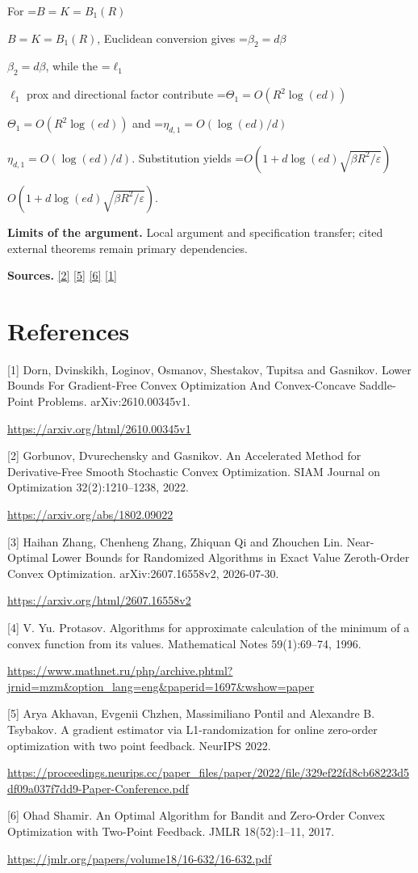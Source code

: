 \documentclass[10pt,a4paper]{article}
\newcommand{\AtlasMath}[1]{\par\begingroup\centering\setbox0=\hbox{$\displaystyle #1$}\ifdim\wd0>1.4\linewidth\typeout{ATLAS WIDE FORMULA: \the\wd0}\fi\ifdim\wd0>\linewidth\resizebox{\linewidth}{!}{\box0}\else\box0\fi\par\endgroup}
\newcommand{\AtlasInlineMath}[1]{\begingroup\setbox0=\hbox{$#1$}\ifdim\wd0>.4\linewidth\endgroup\AtlasMath{#1}\else\endgroup$#1$\fi}
\begin{document}
For \AtlasInlineMath{B=K=B_1(R)}, Euclidean conversion gives \AtlasInlineMath{\beta_2=d\beta}, while the \AtlasInlineMath{\ell_1} prox and directional factor contribute \AtlasInlineMath{\Theta_1=O(R^2\log(ed))} and \AtlasInlineMath{\eta_{d,1}=O(\log(ed)/d)}. Substitution yields \AtlasInlineMath{O(1+d\log(ed)\sqrt{\beta R^2/\varepsilon})}.

\textbf{Limits of the argument.} Local argument and specification transfer; cited external theorems remain primary dependencies.

\textbf{Sources.} \href{https://arxiv.org/abs/1802.09022}{[2]} \href{https://proceedings.neurips.cc/paper_files/paper/2022/file/329ef22fd8cb68223d5df09a037f7dd9-Paper-Conference.pdf}{[5]} \href{https://jmlr.org/papers/volume18/16-632/16-632.pdf}{[6]} \href{https://arxiv.org/html/2610.00345v1}{[1]}

\section{References}
[1] Dorn, Dvinskikh, Loginov, Osmanov, Shestakov, Tupitsa and Gasnikov. Lower Bounds For Gradient-Free Convex Optimization And Convex-Concave Saddle-Point Problems. arXiv:2610.00345v1.

\url{https://arxiv.org/html/2610.00345v1}

[2] Gorbunov, Dvurechensky and Gasnikov. An Accelerated Method for Derivative-Free Smooth Stochastic Convex Optimization. SIAM Journal on Optimization 32(2):1210--1238, 2022.

\url{https://arxiv.org/abs/1802.09022}

[3] Haihan Zhang, Chenheng Zhang, Zhiquan Qi and Zhouchen Lin. Near-Optimal Lower Bounds for Randomized Algorithms in Exact Value Zeroth-Order Convex Optimization. arXiv:2607.16558v2, 2026-07-30.

\url{https://arxiv.org/html/2607.16558v2}

[4] V. Yu. Protasov. Algorithms for approximate calculation of the minimum of a convex function from its values. Mathematical Notes 59(1):69--74, 1996.

\url{https://www.mathnet.ru/php/archive.phtml?jrnid=mzm&option_lang=eng&paperid=1697&wshow=paper}

[5] Arya Akhavan, Evgenii Chzhen, Massimiliano Pontil and Alexandre B. Tsybakov. A gradient estimator via L1-randomization for online zero-order optimization with two point feedback. NeurIPS 2022.

\url{https://proceedings.neurips.cc/paper_files/paper/2022/file/329ef22fd8cb68223d5df09a037f7dd9-Paper-Conference.pdf}

[6] Ohad Shamir. An Optimal Algorithm for Bandit and Zero-Order Convex Optimization with Two-Point Feedback. JMLR 18(52):1--11, 2017.

\url{https://jmlr.org/papers/volume18/16-632/16-632.pdf}
\end{document}
